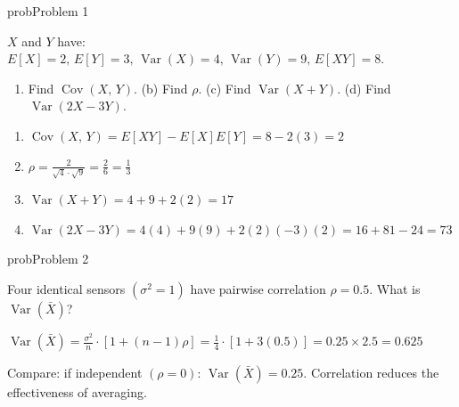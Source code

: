 
\begin{PSbox}[unbreakable]{prob}{Problem 1}

$X$ and $Y$ have: $E[X] = 2,\, E[Y] = 3,\, \operatorname{Var}(X) = 4,\, \operatorname{Var}(Y) = 9,\, E[XY] = 8$.

\begin{enumerate}
\def\labelenumi{(\alph{enumi})}
\tightlist
\item
  Find $\operatorname{Cov}(X,\,Y)$. (b) Find $\rho$. (c) Find $\operatorname{Var}(X+Y)$. (d) Find $\operatorname{Var}(2X-3Y)$.
\end{enumerate}

\PSsolution{} 

\begin{enumerate}
\def\labelenumi{(\alph{enumi})}
\tightlist
\item
  $\operatorname{Cov}(X,\,Y) = E[XY] - E[X]E[Y] = 8 - 2(3) = 2$
\item
  $\displaystyle \rho = \frac{2}{\sqrt{4} \cdot \sqrt{9}} = \frac{2}{6} = \frac{1}{3}$
\item
  $\operatorname{Var}(X+Y) = 4 + 9 + 2(2) = 17$
\item
  $\operatorname{Var}(2X-3Y) = 4(4) + 9(9) + 2(2)(-3)(2) = 16 + 81 - 24 = 73$
\end{enumerate}

\end{PSbox}

\begin{PSbox}[unbreakable]{prob}{Problem 2}

Four identical sensors $(\sigma^{2} = 1)$ have pairwise correlation $\rho = 0.5$. What is $\operatorname{Var}(\bar{X})$?

\PSsolution{} $\displaystyle \operatorname{Var}(\bar{X}) = \frac{\sigma^{2}}{n} \cdot [1 + (n-1)\rho] = \frac{1}{4} \cdot [1 + 3(0.5)] = 0.25 \times 2.5 = 0.625$

Compare: if independent $(\rho = 0)$: $\operatorname{Var}(\bar{X}) = 0.25$. Correlation reduces the effectiveness of averaging.

\end{PSbox}

